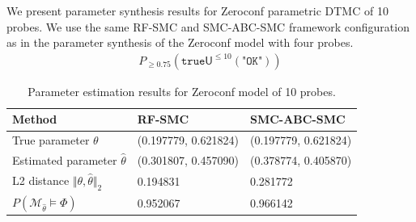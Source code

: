 \newpage
\noindent We present parameter synthesis results for Zeroconf parametric DTMC of 10 probes. We use
the same RF-SMC and SMC-ABC-SMC framework configuration as in the parameter synthesis of the
Zeroconf model with four probes.
\begin{align*}
    P_{\geq 0.75} (\texttt{true} \mathsf{U}^{\leq 10} (\texttt{"OK"}))
\end{align*}
\begin{table}[H]
    \begin{tabular}{|l|l|l|}
        \hline
        Method                                           & RF-SMC               & SMC-ABC-SMC          \\ \hline
        True parameter $\theta$                          & (0.197779, 0.621824) & (0.197779, 0.621824) \\ \hline
        Estimated parameter $\hat{\theta}$               & (0.301807, 0.457090) & (0.378774, 0.405870) \\ \hline
        L2 distance $\Vert \theta, \hat{\theta} \Vert_2$ & 0.194831             & 0.281772             \\ \hline
        $P(\mathcal{M}_{\hat{\theta}}\models\Phi)$       & 0.952067             & 0.966142             \\ \hline
    \end{tabular}
    \caption{Parameter estimation results for Zeroconf model of 10 probes.}
\end{table}


